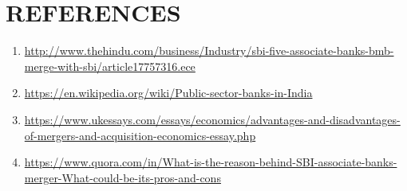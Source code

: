 \documentclass[a4paper, 14pt]{article}
\begin{document}
{\section{REFERENCES}
\begin{enumerate}
\item \href{http://www.thehindu.com/business/Industry/sbi-five-associate-banks-bmb-merge-with-sbi/article17757316.ece}{http://www.thehindu.com/business/Industry/sbi-five-associate-banks-bmb-merge-with-sbi/article17757316.ece}
\item \href{https://en.wikipedia.org/wiki/Public_sector_banks_in_India}{https://en.wikipedia.org/wiki/Public-sector-banks-in-India}
\item \href{https://www.ukessays.com/essays/economics/advantages-and-disadvantages-of-mergers-and-acquisition-economics-essay.php}{https://www.ukessays.com/essays/economics/advantages-and-disadvantages-of-mergers-and-acquisition-economics-essay.php}
\item \href{https://www.quora.com/in/What-is-the-reason-behind-SBI-associate-banks-merger-What-could-be-its-pros-and-cons}{https://www.quora.com/in/What-is-the-reason-behind-SBI-associate-banks-merger-What-could-be-its-pros-and-cons}
\end{enumerate}
}
\end{document}
